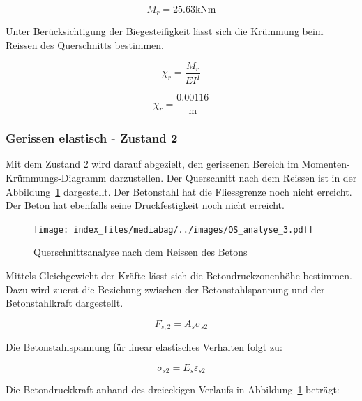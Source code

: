 \documentclass[
  12pt,
  letterpaper,
  egregdoesnotlikesansseriftitles]{scrreprt}
\begin{document}
\begin{equation}M_{r} = 25.63 \text{kN} \text{m}\end{equation}

Unter Berücksichtigung der Biegesteifigkeit lässt sich die Krümmung beim
Reissen des Querschnitts bestimmen.

\begin{equation}\chi_{r} = \frac{M_{r}}{EI^{I}}\end{equation}

\begin{equation}\chi_{r} = \frac{0.00116}{\text{m}}\end{equation}

\hypertarget{gerissen-elastisch---zustand-2}{%
\subsubsection{Gerissen elastisch - Zustand
2}\label{gerissen-elastisch---zustand-2}}

Mit dem Zustand 2 wird darauf abgezielt, den gerissenen Bereich im
Momenten-Krümmungs-Diagramm darzustellen. Der Querschnitt nach dem
Reissen ist in der Abbildung~\ref{fig-qs3} dargestellt. Der Betonstahl
hat die Fliessgrenze noch nicht erreicht. Der Beton hat ebenfalls seine
Druckfestigkeit noch nicht erreicht.

\begin{figure}[H]

{\centering \texttt{[image: index\_files/mediabag/../images/QS\_analyse\_3.pdf]}

}

\caption{\label{fig-qs3}Querschnittsanalyse nach dem Reissen des Betons}

\end{figure}

Mittels Gleichgewicht der Kräfte lässt sich die Betondruckzonenhöhe
bestimmen. Dazu wird zuerst die Beziehung zwischen der
Betonstahlspannung und der Betonstahlkraft dargestellt.

\begin{equation}F_{s,2} = A_{s} \sigma_{s 2}\end{equation}

Die Betonstahlspannung für linear elastisches Verhalten folgt zu:

\begin{equation}\sigma_{s 2} = E_{s} \varepsilon_{s2}\end{equation}

Die Betondruckkraft anhand des dreieckigen Verlaufs in
Abbildung~\ref{fig-qs3} beträgt:
\end{document}
